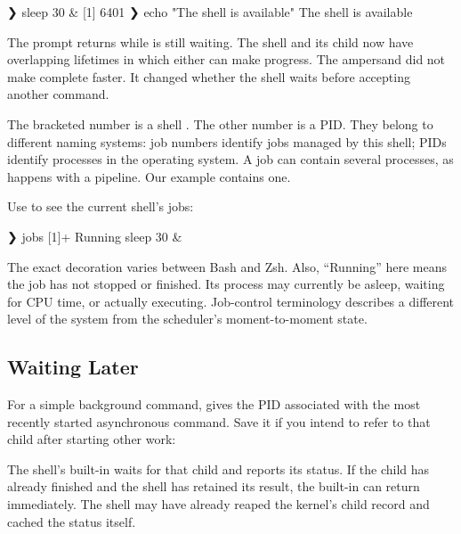 \documentclass[11pt]{article}
\begin{document}
\begin{terminal}[unbreakable]
❯ sleep 30 &
[1] 6401
❯ echo "The shell is available"
The shell is available
\end{terminal}

The prompt returns while  is still waiting.
The shell and its child now have overlapping lifetimes in which either can make progress.
The ampersand did not make  complete faster.
It changed whether the shell waits before accepting another command.

The bracketed number is a shell .
The other number is a PID.
They belong to different naming systems: job numbers identify jobs managed by this shell; PIDs identify processes in the operating system.
A job can contain several processes, as happens with a pipeline.
Our example contains one.

Use  to see the current shell's jobs:

\begin{terminal}[unbreakable]
❯ jobs
[1]+  Running                 sleep 30 &
\end{terminal}

The exact decoration varies between Bash and Zsh.
Also, ``Running'' here means the job has not stopped or finished.
Its process may currently be asleep, waiting for CPU time, or actually executing.
Job-control terminology describes a different level of the system from the scheduler's moment-to-moment state.

\subsection{Waiting Later}

For a simple background command, \inlinesh{$!} gives the PID associated with the most recently started asynchronous command.
Save it if you intend to refer to that child after starting other work:


The shell's  built-in waits for that child and reports its status.
If the child has already finished and the shell has retained its result, the built-in can return immediately.
The shell may have already reaped the kernel's child record and cached the status itself.
\end{document}
